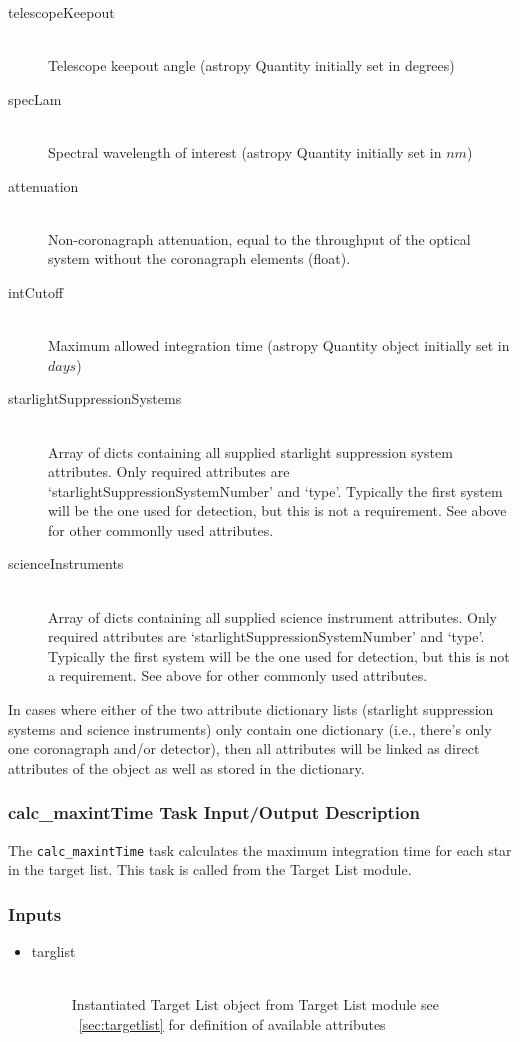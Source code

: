 \documentclass[cleanfoot]{asme2ej}
\begin{document}
\begin{itemize}
\begin{description}
    \item[telescopeKeepout] \hfill \\
    Telescope keepout angle (astropy Quantity initially set in degrees)
    \item[specLam] \hfill \\
    Spectral wavelength of interest (astropy Quantity initially set in $ nm $)
    \item[attenuation] \hfill \\
    Non-coronagraph attenuation, equal to the throughput of the optical system without the coronagraph elements (float).
    \item[intCutoff] \hfill \\
    Maximum allowed integration time (astropy Quantity object initially set in $ days $)
    \item[starlightSuppressionSystems] \hfill \\  Array of dicts containing all supplied starlight suppression system attributes.  Only required attributes are `starlightSuppressionSystemNumber' and `type'.  Typically the first system will be the one used for detection, but this is not a requirement.  See above for other commonlly used attributes.
    \item[scienceInstruments] \hfill \\  Array of dicts containing all supplied science instrument attributes.  Only required attributes are `starlightSuppressionSystemNumber' and `type'.  Typically the first system will be the one used for detection, but this is not a requirement.  See above for other commonly used attributes.
\end{description}
\end{itemize}
In cases where either of the two attribute dictionary lists (starlight suppression systems and science instruments) only contain one dictionary (i.e., there's only one coronagraph and/or detector), then all attributes will be linked as direct attributes of the object as well as stored in the dictionary.

\subsubsection{calc\_maxintTime Task Input/Output Description} \label{sec:calcmaxintTimetask}
The \verb+calc_maxintTime+ task calculates the maximum integration time for each star in the target list.  This task is called from the Target List module.
\subsubsection*{Inputs}
\begin{itemize}
    \item 
    \begin{description}
        \item[targlist] \hfill \\
        Instantiated Target List object from Target List module see ~\ref{sec:targetlist} for definition of available attributes
    \end{description}
\end{itemize}
\end{document}
